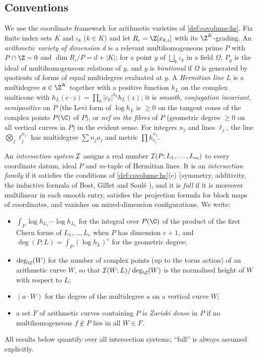 \subsection{Conventions}\label{pf:volthm:sec:conv}

We use the coordinate framework for arithmetic varieties of \cref{def:covolume:hs}. Fix finite index sets
$K$ and $\iota_k$ ($k\in K$) and let $R_\iota=\Z[x_{k,i}]$ with its $\Z^K$-grading. An
\emph{arithmetic variety of dimension $d$} is a relevant multihomogeneous prime $P$ with $P\cap\Z=0$ and
$\dim R_\iota/P=d+|K|$; for a point $y$ of $\bigsqcup_k\iota_k$ in a field $\Omega$,
$P_y$ is the ideal of multihomogeneous relations of $y$, and $y$ is
\emph{birational} if $\Omega$ is generated by quotients of forms of equal multidegree evaluated at $y$. A
\emph{Hermitian line} $L$ is a multidegree $a\in\Z^K$ together with a positive function $h_L$ on the complex
multicone with $h_L(c\cdot z)=\prod_k|c_k|^{a_k}h_L(z)$; it is \emph{smooth}, \emph{conjugation invariant},
\emph{semipositive} on $P$ (the Levi form of $\log h_L$ is $\ge0$ on the tangent cones of the complex points
$P(\C)$ of $P$), or \emph{nef on the fibres} of $P$ (geometric degree $\ge0$ on all vertical curves in $P$)
in the evident sense. For integers $n_j$ and lines $\ell_j$, the line $\bigotimes_j\ell_j^{n_j}$ has multidegree $\sum n_ja_j$ and metric $\prod h_{\ell_j}^{n_j}$.

An \emph{intersection system} $\mathcal{I}$ assigns a real number $\mathcal{I}(P;L_1,\dots,L_m)$ to every
coordinate datum, ideal $P$ and $m$-tuple of Hermitian lines. It is an \emph{intersection family} if it
satisfies the conditions of \cref{def:covolume:hs}(c) (symmetry, additivity, the inductive formula of Bost,
Gillet and Soul\'e \cite{BostGilletSoule1994}), and it is \emph{full} if it is moreover multilinear in each
smooth entry, satisfies the projection formula for block maps of coordinates, and vanishes on
mixed-dimension configurations. We write:
\begin{itemize}
\item $\int_P\log h_{L_1}\cdots\log h_{L_e}$ for the integral over $P(\C)$ of the product of the first Chern
  forms of $L_1,\dots,L_e$ when $P$ has dimension $e+1$, and
  $\deg(P;L)=\int_P(\log h_L)^{e}$ for the geometric degree;
\item $\deg_\C(W)$ for the number of complex points (up to the torus action) of an arithmetic curve $W$, so that $\volthmII(W;L)/\deg_\C(W)$ is the normalised height of $W$ with respect to $L$;
\item $(a\cdot W)$ for the degree of the multidegree $a$ on a vertical curve $W$;
\item a set $F$ of arithmetic curves containing $P$ is \emph{Zariski dense} in $P$ if no multihomogeneous
  $f\notin P$ lies in all $W\in F$.
\end{itemize}
All results below quantify over all intersection systems; ``full'' is always assumed explicitly.

